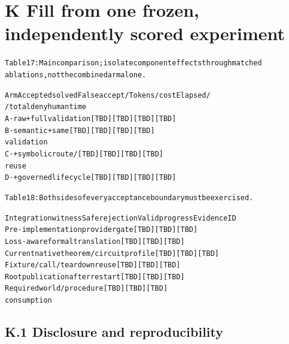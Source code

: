 \documentclass{article}
\begin{document}
\section*{K Fill from one frozen, independently scored experiment}

\begingroup\fontsize{7}{8.4}\selectfont
\begin{alltt}
Table 17: Main comparison; isolate component effects through matched
ablations, not the combined arm alone.
\end{alltt}\endgroup

\begingroup\fontsize{7}{8.4}\selectfont
\begin{alltt}
Arm                         Accepted solved      False accept /    Tokens / cost     Elapsed /
                            / total              deny                                human time
A · raw + full validation   [TBD]                [TBD]             [TBD]             [TBD]
B · semantic + same         [TBD]                [TBD]             [TBD]             [TBD]
validation
C · + symbolic route /      [TBD]                [TBD]             [TBD]             [TBD]
reuse
D · + governed lifecycle    [TBD]                [TBD]             [TBD]             [TBD]
\end{alltt}\endgroup




\begingroup\fontsize{7}{8.4}\selectfont
\begin{alltt}
Table 18: Both sides of every acceptance boundary must be exercised.
\end{alltt}\endgroup

\begingroup\fontsize{7}{8.4}\selectfont
\begin{alltt}
Integration witness                       Safe rejection       Valid progress        Evidence ID
Pre-implementation provider gate          [TBD]                [TBD]                 [TBD]
Loss-aware formal translation             [TBD]                [TBD]                 [TBD]
Current native theorem/circuit profile    [TBD]                [TBD]                 [TBD]
Fixture/call/teardown reuse               [TBD]                [TBD]                 [TBD]
Root publication after restart            [TBD]                [TBD]                 [TBD]
Required world/procedure                  [TBD]                [TBD]                 [TBD]
consumption
\end{alltt}\endgroup


\subsection*{K.1 Disclosure and reproducibility}
\end{document}
